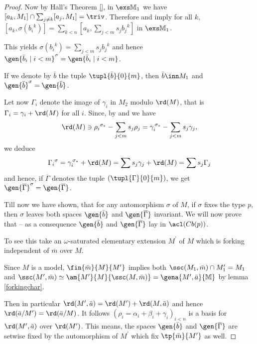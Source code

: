 \documentclass[11pt,english]{article}
\begin{document}
\begin{proof}
Now by Hall's Theorem \ref{},
in $\exs\mathbb{M}_{1}$ we have $[a_{k},{M}_{1}]\cap\sum_{j\neq k}[a_{j},{M}_{1}]=\triv$.
Therefore  and  imply for all $k$, $[a_{k},\sigma({b_{i}}^{k})]=
\sum_{k<n}[a_{k},\sum_{j<m}s_{j}{b_{j}}^{k}]$
in $\exs\mathbb{M}_{1}$.

This yields $\sigma({b_{i}}^{k})=\sum_{j<m}s_{j}{b_{j}}^{k}$ and hence
$\gen{\bar b_{i}\mid i<m}^{\sigma}=\gen{\bar b_{i}\mid i<m}$.

\medskip
If we denote by $\bar b$ the tuple $\tupl{\bar b}{0}{m}$,
then $\bar b\inn M_{1}$ and $\gen{\bar b}^{\sigma}=\gen{\bar b}$.

\medskip
Let now $\Gamma_{i}$ denote the image of $\gamma_{i}$ in $M_{2}$ modulo $\rd(M)$, that is
$\Gamma_{i}=\gamma_{i}+\rd(M)$ for all $i$. Since, by  and  we have
$$
\rd(M)\ni{\rho_{i}}^{\sigma_{*}}-\sum_{j<m} s_{j}\rho_{j}=\gamma_{i}^{\,\sigma_{*}}-\sum_{j<m}s_{j}\gamma_{j},$$
we deduce
$${\Gamma_{i}}^{\sigma}=\gamma_{i}^{\,\sigma_{*}}+\rd(M)=\sum s_{j}\gamma_{j}
+\rd(M)=\sum s_{j}\Gamma_{j}$$
and hence, if $\overline{\Gamma}$ denotes the tuple $(\tupl{\Gamma}{0}{m})$,
we get $\gen{\overline{\Gamma}}^{\sigma}=\gen{\overline{\Gamma}}$.

\smallskip
Till now we have shown, that for any automorphism $\sigma$ of $M$,
if $\sigma$ fixes the type $p$, then $\sigma$ leaves both spaces $\gen{\bar b}$ and $\gen{\overline{\Gamma}}$
invariant. We will now prove that -- as a consequence $\gen{\bar b}$ and $\gen{\overline{\Gamma}}$ lay in $\acl(Cb(p))$.

\cbstart
To see this take an $\omega$-saturated elementary extension $M^{\prime}$ %
of $M$ which is forking independent of $\bar m$ over $M$.

Since $M$ is a model, $\fin{\bar m}{M}{M^{\prime}}$ implies both $\ssc(M_{1},\bar m)\cap M^{\prime}_{1}=M_{1}$
and $\ssc(M^{\prime},\bar m)\simeq\am{M^{\prime}}{M}{\ssc(M,\bar m)}=\gena{M^{\prime},\bar a}{\mathbb{M}}$
by lemma \ref{forkingchar}.

Then in particular $\rd(M^{\prime},\bar a)=\rd(M^{\prime})+\rd(M,\bar a)$
and hence %
$\rd(\bar a/M^{\prime})=\rd(\bar a/M)$. It follows $(\rho_{i}=\alpha_{i}+\beta_{i}+\gamma_{i})_{i<n}$ is
a basis for $\rd(M^{\prime},\bar a)$ over $\rd(M^{\prime})$.
This means, the spaces $\gen{\bar b}$ and $\gen{\overline{\Gamma}}$
are setwise fixed by the automorphism of
$M^{\prime}$ which fix $\tp{\bar m}{M^{\prime}}$ as well.


\end{proof}
\end{document}
